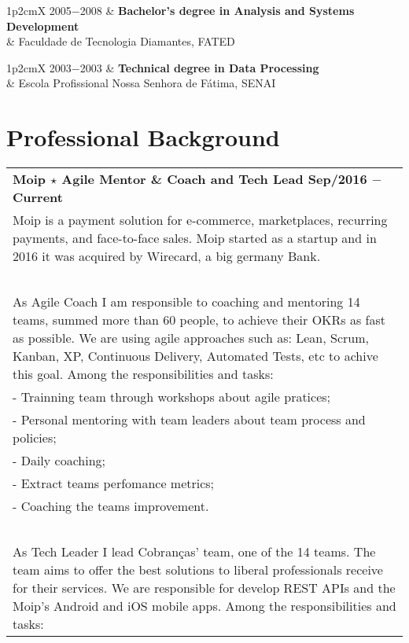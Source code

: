 \documentclass[a4paper, oneside, final]{scrartcl}
\newcommand{\vspc}{\vspace{0.15cm}} %
\begin{document}
\begin{center}
\begin{tabularx}{1\linewidth}{p{2cm}X}
2005$-$2008 & {\bf Bachelor's degree in Analysis and Systems Development}\\
            & Faculdade de Tecnologia Diamantes, FATED \vspc\\
\end{tabularx}

\begin{tabularx}{1\linewidth}{p{2cm}X}
2003$-$2003 & {\bf Technical degree in Data Processing}\\
            & Escola Profissional Nossa Senhora de Fátima, SENAI\\
\end{tabularx}

\section{Professional Background}
\begin{tabularx}{1\linewidth}{X}
{\bf Moip $\star$ Agile Mentor \& Coach and Tech Lead \hfill Sep/2016 $-$ Current} \\
Moip is a payment solution for e-commerce, marketplaces, recurring payments, and face-to-face sales. Moip started as a startup and in 2016 it was acquired by Wirecard, a big germany Bank. \\ \ \\

As Agile Coach I am responsible to coaching and mentoring 14 teams, summed more than 60 people, to achieve their OKRs as fast as possible. We are using agile approaches such as: Lean, Scrum, Kanban, XP, Continuous Delivery, Automated Tests, etc to achive this goal. Among the responsibilities and tasks: \\

- Trainning team through workshops about agile pratices; \\
- Personal mentoring with team leaders about team process and policies; \\
- Daily coaching; \\
- Extract teams perfomance metrics; \\
- Coaching the teams improvement. \\ \ \\

As Tech Leader I lead Cobranças' team, one of the 14 teams. The team aims to offer the best solutions to liberal professionals receive for their services. We are responsible for develop REST APIs and the Moip's Android and iOS mobile apps. Among the responsibilities and tasks:


\end{tabularx}
\end{center}
\end{document}
